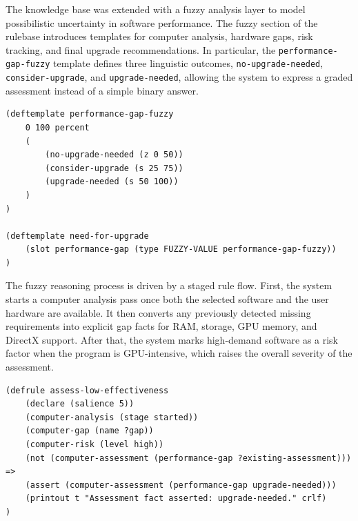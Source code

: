 \documentclass{article}
\begin{document}

The knowledge base was extended with a fuzzy analysis layer to model possibilistic uncertainty in software performance. The fuzzy section of the rulebase introduces templates for computer analysis, hardware gaps, risk tracking, and final upgrade recommendations. In particular, the \texttt{performance-gap-fuzzy} template defines three linguistic outcomes, \texttt{no-upgrade-needed}, \texttt{consider-upgrade}, and \texttt{upgrade-needed}, allowing the system to express a graded assessment instead of a simple binary answer.

\begin{file}
    \begin{lstlisting}
(deftemplate performance-gap-fuzzy
    0 100 percent
    (
        (no-upgrade-needed (z 0 50))
        (consider-upgrade (s 25 75))
        (upgrade-needed (s 50 100))
    )
)

(deftemplate need-for-upgrade
    (slot performance-gap (type FUZZY-VALUE performance-gap-fuzzy))
)
\end{lstlisting}
\end{file}

The fuzzy reasoning process is driven by a staged rule flow. First, the system starts a computer analysis pass once both the selected software and the user hardware are available. It then converts any previously detected missing requirements into explicit gap facts for RAM, storage, GPU memory, and DirectX support. After that, the system marks high-demand software as a risk factor when the program is GPU-intensive, which raises the overall severity of the assessment.

\begin{file}
    \begin{lstlisting}
(defrule assess-low-effectiveness
    (declare (salience 5))
    (computer-analysis (stage started))
    (computer-gap (name ?gap))
    (computer-risk (level high))
    (not (computer-assessment (performance-gap ?existing-assessment)))
=>
    (assert (computer-assessment (performance-gap upgrade-needed)))
    (printout t "Assessment fact asserted: upgrade-needed." crlf)
)
\end{lstlisting}
\end{file}
\end{document}
